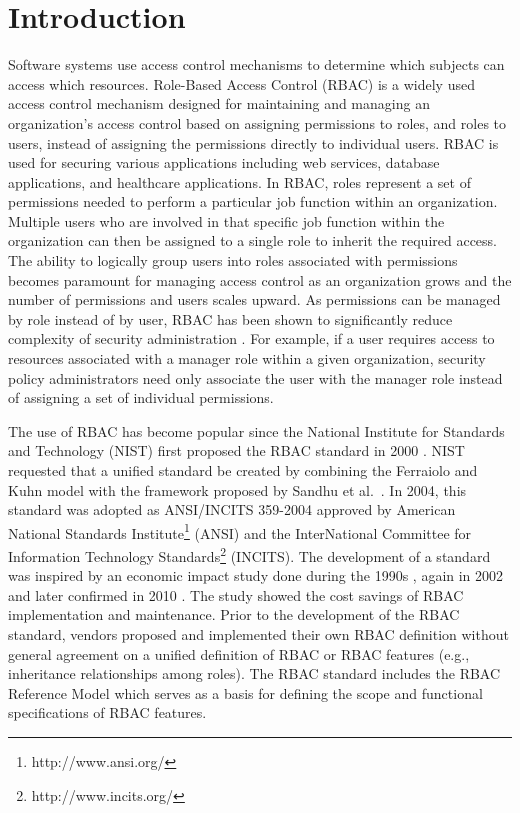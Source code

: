 \section{Introduction} \label{sec:introduction}

Software systems use access control mechanisms to determine which subjects can access which resources.
Role-Based Access Control (RBAC) is a widely used access control mechanism designed for maintaining and managing an organization's  access control based on assigning permissions to roles, and roles to users, instead of assigning the permissions directly to individual users.
RBAC is used for securing various applications including web services, database applications, and healthcare applications. 
In RBAC, roles represent a set of permissions needed to perform a particular job function within an organization.  
Multiple users who are involved in that specific job function within the organization can then be assigned to a single role to inherit the required access. 
The ability to logically group users into roles associated with permissions becomes paramount for managing access control as an organization grows and the number of permissions and users scales upward.
As permissions can be managed by role instead of by user, RBAC has been shown to significantly reduce complexity of security administration \cite{impact2002}.
For example, if a user requires access to resources associated with a manager role within a given organization, security policy administrators need only associate the user with the manager role instead of assigning a set of individual permissions.

The use of RBAC has become popular since the National Institute for Standards and Technology (NIST) first proposed the RBAC standard in 2000 \cite{sandhu2000nist}.
NIST requested that a unified standard be created by combining the Ferraiolo and Kuhn model \cite{ferraiolokuhn} with the framework proposed by Sandhu et al.~\cite{sandhu1996role}.  
In 2004, this standard was adopted as ANSI/INCITS 359-2004 approved by American National Standards Institute\footnote{http://www.ansi.org/} (ANSI) and the InterNational Committee for Information Technology Standards\footnote{http://www.incits.org/} (INCITS).
The development of a standard was inspired by an economic impact study done during the 1990s \cite{impact1996}, again in 2002 \cite{impact2002} and later confirmed in 2010 \cite{o20102010}. 
The study showed the cost savings of RBAC implementation and maintenance. 
Prior to the development of the RBAC standard, vendors proposed and implemented their own RBAC definition without general agreement on a unified definition of RBAC or RBAC features (e.g., inheritance relationships among roles). 
The RBAC standard includes the RBAC Reference Model which serves as a basis for defining the scope and functional specifications of RBAC features.

